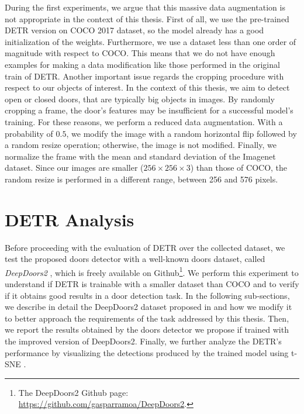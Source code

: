 During the first experiments, we argue that this massive data augmentation is not appropriate in the context of this thesis. First of all, we use the pre-trained DETR version on COCO 2017 dataset, so the model already has a good initialization of the weights. Furthermore, we use a dataset less than one order of magnitude with respect to COCO. This means that we do not have enough examples for making a data modification like those performed in the original train of DETR. Another important issue regards the cropping procedure with respect to our objects of interest. In the context of this thesis, we aim to detect open or closed doors, that are typically big objects in images. By randomly cropping a frame, the door's features may be insufficient for a successful model's training. For these reasons, we perform a reduced data augmentation. With a probability of $0.5$, we modify the image with a random horizontal flip followed by a random resize operation; otherwise, the image is not modified. Finally, we normalize the frame with the mean and standard deviation of the Imagenet dataset. Since our images are smaller ($256 \times 256 \times 3$) than those of COCO, the random resize is performed in a different range, between 256 and 576 pixels. 

\section{DETR Analysis}

Before proceeding with the evaluation of DETR over the collected dataset, we test the proposed doors detector with a well-known doors dataset, called \textit{DeepDoors2} \cite{deepdoors2}, which is freely available on Github\footnote{The DeepDoors2 Github page: \url{https://github.com/gasparramoa/DeepDoors2}.}. We perform this experiment to understand if DETR is trainable with a smaller dataset than COCO and to verify if it obtains good results in a door detection task. In the following sub-sections, we describe in detail the DeepDoors2 dataset proposed in \cite{deepdoors2} and how we modify it to better approach the requirements of the task addressed by this thesis. Then, we report the results obtained by the doors detector we propose if trained with the improved version of DeepDoors2. Finally, we further analyze the DETR's performance by visualizing the detections produced by the trained model using t-SNE \cite{tsne}.

